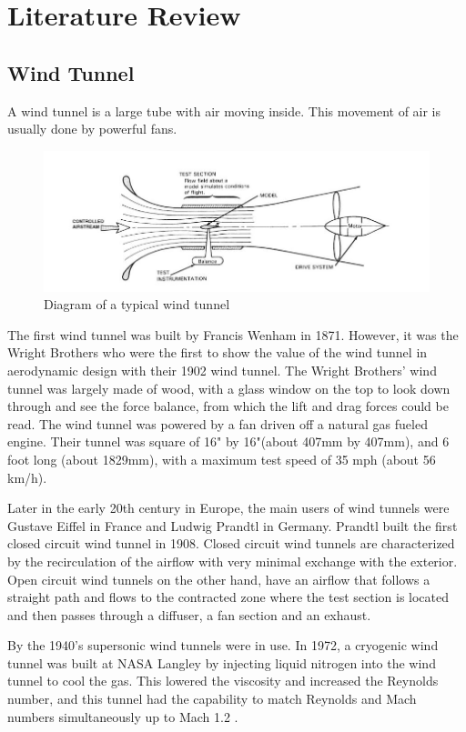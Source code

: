 \chapter{Literature Review}
\section{Wind Tunnel}
A wind tunnel is a large tube with air moving inside. This movement of air is usually done by powerful fans.
\begin{center}
	\begin{figure}[!htb]
	\centering
	\includegraphics[width=0.7\linewidth]{Figures/Fig2}
	\caption[A Typical Wind Tunnel]{Diagram of a typical wind tunnel \cite{morris_force_2010}}
	\end{figure}
\end{center} 
The first wind tunnel was built by Francis Wenham in 1871. However, it was the Wright Brothers who were the first to show the value of the wind tunnel in aerodynamic design with their 1902 wind tunnel. The Wright Brothers’ wind tunnel was largely made of wood, with a glass window on the top to look down through and see the force balance, from which the
lift and drag forces could be read. The wind tunnel was powered by a fan driven off a natural gas fueled engine. Their tunnel was square of 16" by 16"(about 407mm by 407mm), and 6 foot long (about 1829mm), with a maximum test speed of 35 mph (about 56 km/h)\cite{morris_force_2010}.


Later in the early 20th century in Europe, the main users of wind tunnels were Gustave Eiffel in France and Ludwig Prandtl in Germany. Prandtl built the first closed circuit wind tunnel in 1908. Closed circuit wind tunnels are characterized by the recirculation of the airflow with very minimal exchange with the exterior. Open circuit wind tunnels on the other hand, have an airflow that follows a straight path and flows to the contracted zone where the test section is located and then passes through a diffuser, a fan section and an exhaust.

By the 1940’s supersonic wind tunnels were in use. In 1972, a cryogenic wind tunnel was built at NASA Langley by injecting liquid nitrogen into the wind tunnel to cool the gas. This lowered the viscosity and increased the Reynolds number, and this tunnel had the capability to match Reynolds and Mach numbers simultaneously up to Mach 1.2
\cite{fernandes_design_nodate}.


